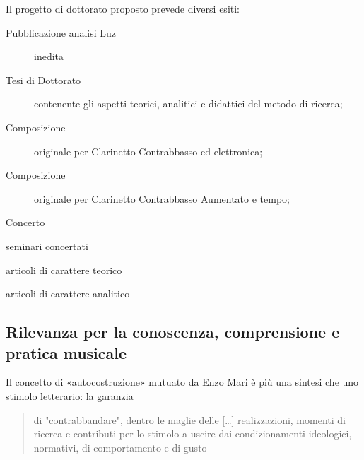 \documentclass{gs-adonis}
\begin{document}

Il progetto di dottorato proposto prevede diversi esiti:

\begin{description}
  \item[Pubblicazione analisi Luz] inedita
  \item[Tesi di Dottorato] contenente gli aspetti teorici, analitici e didattici del metodo di ricerca;
  \item[Composizione] originale per Clarinetto Contrabbasso ed elettronica;
  \item[Composizione] originale per Clarinetto Contrabbasso Aumentato e tempo;
  \item[Concerto]
\end{description}


seminari concertati

articoli di carattere teorico

articoli di carattere analitico

\subsection{Rilevanza per la conoscenza, comprensione e pratica musicale}



Il concetto di «autocostruzione» mutuato da Enzo Mari \cite{mari2002} è più una
sintesi che uno stimolo letterario: la garanzia

\begin{quote}
  di "contrabbandare", dentro le maglie delle […] realizzazioni, momenti di
  ricerca e contributi per lo stimolo a uscire dai condizionamenti ideologici,
  normativi, di comportamento e di gusto
\end{quote}
\end{document}
